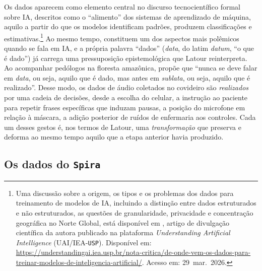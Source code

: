 Os dados aparecem como elemento central no discurso tecnocientífico formal sobre IA, descritos como o \enquote{alimento} dos sistemas de aprendizado de máquina, aquilo a partir do que os modelos identificam padrões, produzem classificações e estimativas.\footnote{Uma discussão sobre a origem, os tipos e os problemas dos dados para treinamento de modelos de IA, incluindo a distinção entre dados estruturados e não estruturados, as questões de granularidade, privacidade e concentração geográfica no Norte Global, está disponível em \textcite{Helanski2025Dados}, artigo de divulgação científica da autora publicado na plataforma \textit{Understanding Artificial Intelligence} (UAI/IEA-\texttt{USP}). Disponível em: \url{https://understandingai.iea.usp.br/nota-critica/de-onde-vem-os-dados-para-treinar-modelos-de-inteligencia-artificial/}. Acesso em: 29~mar.~2026.} Ao mesmo tempo, constituem um dos aspectos mais polêmicos quando se fala em IA, e a própria palavra \enquote{dados} (\textit{data}, do latim \textit{datum}, \enquote{o que é dado}) já carrega uma pressuposição epistemológica que Latour reinterpreta. Ao acompanhar pedólogos na floresta amazônica, \textcite[p.~57]{Latour2017Esperanca} propõe que \enquote{nunca se deve falar em \textit{data}, ou seja, aquilo que é dado, mas antes em \textit{sublata}, ou seja, aquilo que é realizado}. Desse modo, os dados de áudio coletados no covideiro são \textit{realizados} por uma cadeia de decisões, desde a escolha do celular, a instrução ao paciente para repetir frases específicas que induzam pausas, a posição do microfone em relação à máscara, a adição posterior de ruídos de enfermaria aos controles. Cada um desses gestos é, nos termos de Latour, uma \textit{transformação} que preserva e deforma ao mesmo tempo aquilo que a etapa anterior havia produzido.

\subsection{Os dados do \texttt{Spira}}
\label{subsec:de_onde_dados}

